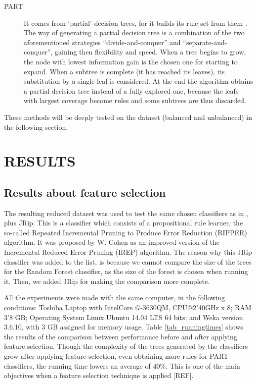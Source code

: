 \documentclass{llncs}
\begin{document}
\begin{description}
 \item[PART] It comes from `partial' decision trees, for it builds its rule set from them \cite{Frank1998}. The way of generating a partial decision tree is a combination of the two aforementioned strategies ``divide-and-conquer'' and ``separate-and-conquer'', gaining then flexibility and speed. When a tree begins to grow, the node with lowest information gain is the chosen one for starting to expand. When a subtree is complete (it has reached its leaves), its substitution by a single leaf is considered. At the end the algorithm obtains a partial decision tree instead of a fully explored one, because the leafs with largest coverage become rules and some subtrees are thus discarded.
 \end{description}

These methods will be deeply tested on the dataset (balanced and unbalanced) in the following section.

%
\section{\uppercase{Results}}
\label{sec:results}

\subsection{Results about feature selection}
\label{subsec:RSTresults}

The resulting reduced dataset was used to test the same chosen classifiers as in \cite{ECTA}, plus JRip. This is a classifier which consists of a propositional rule learner, the so-called Repeated Incremental Pruning to Produce Error Reduction (RIPPER) algorithm. It was proposed by W. Cohen \cite{cohen1995fast} as an improved version of the Incremental Reduced Error Pruning (IREP) algorithm. The reason why this JRip classifier was added to the list, is because we cannot compare the size of the trees for the Random Forest classifier, as the size of the forest is chosen when running it. Then, we added JRip for making the comparison more complete.

All the experiments were made with the same computer, in the following conditions: Toshiba Laptop with Intel\texttrademark  Core i7-3630QM, CPU@2'40GHz x 8; RAM 3'8 GB; Operating System Linux Ubuntu 14.04 LTS 64 bits; and Weka version 3.6.10, with 3 GB assigned for memory usage. Table \ref{tab_runningtimes} shows the results of the comparison between performance before and after applying feature selection. Though the complexity of the trees generated by the classifiers grow after applying feature selection, even obtaining more rules for PART classifiers, the running time lowers an average of 40\%. This is one of the main objectives when a feature selection technique is applied [REF].
\end{document}
